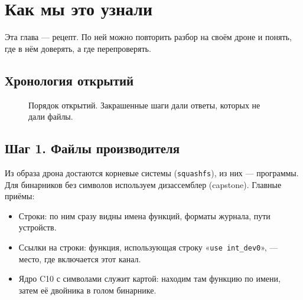 \chapter{Как мы это узнали}\label{ch:kak}

Эта глава --- рецепт. По ней можно повторить разбор на своём дроне и понять, где в нём доверять, а где перепроверять.

\section{Хронология открытий}

\begin{figure}[tbp]
\centering
{}
\caption{Порядок открытий. Закрашенные шаги дали ответы, которых не дали файлы.}\label{fig:timeline}
\end{figure}

\section{Шаг 1. Файлы производителя}

Из образа дрона достаются корневые системы (\texttt{squashfs}), из них --- программы. Для бинарников без символов используем дизассемблер (capstone). Главные приёмы:

\begin{itemize}
  \item Строки: по ним сразу видны имена функций, форматы журнала, пути устройств.
  \item Ссылки на строки: функция, использующая строку «\texttt{use int\_dev0}», --- место, где включается этот канал.
  \item Ядро C10 с символами служит картой: находим там функцию по имени, затем её двойника в голом бинарнике.
\end{itemize}

